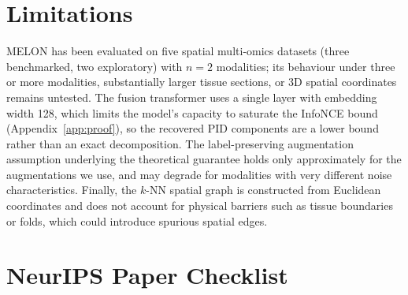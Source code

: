 \documentclass{article}
\theoremstyle{plain}
\theoremstyle{definition}
\begin{document}
\FloatBarrier

\section{Limitations}\label{app:limitations}

MELON has been evaluated on five spatial multi-omics datasets (three benchmarked, two exploratory) with $n=2$ modalities; its behaviour under three or more modalities, substantially larger tissue sections, or 3D spatial coordinates remains untested. The fusion transformer uses a single layer with embedding width 128, which limits the model's capacity to saturate the InfoNCE bound (Appendix~\ref{app:proof}), so the recovered PID components are a lower bound rather than an exact decomposition. The label-preserving augmentation assumption underlying the theoretical guarantee holds only approximately for the augmentations we use, and may degrade for modalities with very different noise characteristics. Finally, the $k$-NN spatial graph is constructed from Euclidean coordinates and does not account for physical barriers such as tissue boundaries or folds, which could introduce spurious spatial edges.

\newpage
\section*{NeurIPS Paper Checklist}
\end{document}
